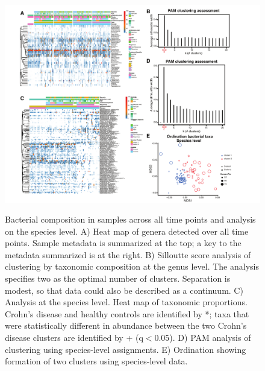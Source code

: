\begin{figure}[p]
\centering
{\includegraphics[scale=0.62,trim=20 0 0 0,clip]{Figure/F2S1_heatmap.pdf}}
\caption[Bacterial composition in samples across all time points and analysis on the species level]{Bacterial composition in samples across all time points and analysis on the species level. A) Heat map of genera detected over all time points. Sample metadata is summarized at the top; a key to the metadata summarized is at the right. B) Silloutte score analysis of clustering by taxonomic composition at the genus level. The analysis specifies two as the optimal number of clusters. Separation is modest, so that data could also be described as a continuum. C) Analysis at the species level. Heat map of taxonomic proportions. Crohn's disease and healthy controls are identified by *; taxa that were statistically different in abundance between the two Crohn's disease clusters are identified by + (q$<$0.05). D) PAM analysis of clustering using species-level assignments. E) Ordination showing formation of two clusters using species-level data. }
\label{F2S1_heatmap}
\end{figure}

